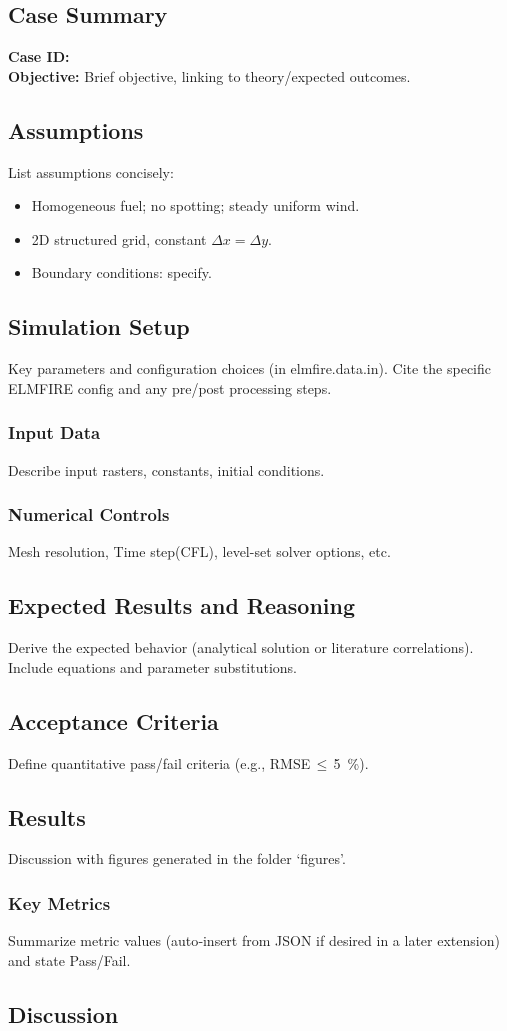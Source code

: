 \documentclass[../report/case_report.tex]{subfiles}
\begin{document}
\subsection*{Case Summary}
\textbf{Case ID:} \CaseID\\
\textbf{Objective:} Brief objective, linking to theory/expected outcomes.


\subsection{Assumptions}
List assumptions concisely:
\begin{itemize}[nosep]
\item Homogeneous fuel; no spotting; steady uniform wind.
\item 2D structured grid, constant \(\Delta x = \Delta y\).
\item Boundary conditions: specify.
\end{itemize}


\subsection{Simulation Setup}
Key parameters and configuration choices (in elmfire.data.in). Cite the specific ELMFIRE config and any pre/post processing steps.


\subsubsection{Input Data}
Describe input rasters, constants, initial conditions.


\subsubsection{Numerical Controls}
Mesh resolution, Time step(CFL), level-set solver options, etc.


\subsection{Expected Results and Reasoning}
Derive the expected behavior (analytical solution or literature correlations). Include equations and parameter substitutions.


\subsection{Acceptance Criteria}
Define quantitative pass/fail criteria (e.g., RMSE\,\(\leq\)\,\SI{5}{\percent}).


\subsection{Results}
Discussion with figures generated in the folder `figures'. 


\subsubsection{Key Metrics}
Summarize metric values (auto‑insert from JSON if desired in a later extension) and state Pass/Fail.


\subsection{Discussion}
\end{document}
